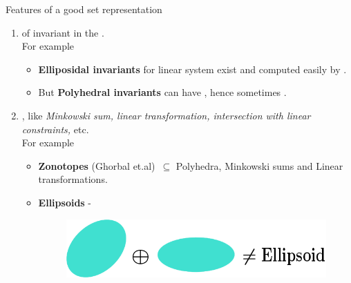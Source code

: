 \begin{frame}{Features of a good set representation}
\pause
\begin{enumerate}
\item {} of invariant in the .\\
\pause
{\color{brown} For example}
\begin{itemize}
\item {\bf Elliposidal invariants} for linear system exist and computed easily by .
\item But {\bf Polyhedral invariants} can have , hence sometimes .
\end{itemize}
\pause
\item {}, like \emph{Minkowski sum, linear transformation, intersection with linear constraints,} etc.\\
\pause
{\color{brown} For example}
\begin{itemize}
\item {\bf Zonotopes} (Ghorbal et.al)~\cite{DBLP:conf/cav/GhorbalGP09}$\subseteq$ {\color{brown} Polyhedra},   {Minkowski sums and Linear transformations}.
\item {\bf Ellipsoids} - 
\begin{figure}
\includegraphics[scale=0.3]{fig/minkowski-ellipsoid.png}
\end{figure}
\end{itemize}
\end{enumerate}
\end{frame}

